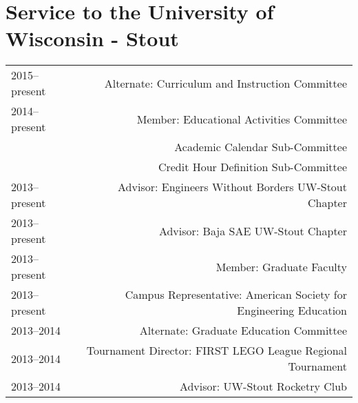 \section*{Service to the University of Wisconsin - Stout}
\begin{tabular}{L!{\VRule}R}
2015--present&Alternate: Curriculum and Instruction Committee \\
2014--present&Member: Educational Activities Committee \\
 &Academic Calendar Sub-Committee \\
 &Credit Hour Definition Sub-Committee \\
2013--present&Advisor: Engineers Without Borders UW-Stout Chapter \\
2013--present&Advisor: Baja SAE UW-Stout Chapter \\
2013--present&Member: Graduate Faculty \\
2013--present&Campus Representative: American Society for Engineering Education\\
2013--2014&Alternate: Graduate Education Committee \\
2013--2014&Tournament Director: FIRST LEGO League Regional Tournament\\
2013--2014&Advisor: UW-Stout Rocketry Club\\
\end{tabular}